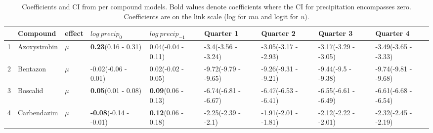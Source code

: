 \begingroup\fontsize{8pt}{10pt}\selectfont
\begin{longtable}{lp{2cm}p{0.6cm}p{1.8cm}p{1.8cm}p{1.8cm}p{1.8cm}p{1.8cm}p{1.8cm}}
\caption{Coefficients and CI from per compound models. 
                     Bold values denote coefficients where the CI for precipitation encompasses zero.
                     Coefficients are on the link scale (log for $mu$ and logit for $
u$).} \\ 
  \toprule
 & Compound & effect & $log~precip_0$ & $log~precip_{-1}$ & Quarter 1 & Quarter 2 & Quarter 3 & Quarter 4 \\ 
  \midrule
1 & Azoxystrobin & $\mu$ & \textbf{0.23}\newline (0.16 - 0.31) & 0.04\newline (-0.04 - 0.11) & -3.4\newline (-3.56 - -3.24) & -3.05\newline (-3.17 - -2.93) & -3.17\newline (-3.29 - -3.05) & -3.49\newline (-3.65 - -3.33) \\ 
  2 & Bentazon & $\mu$ & -0.02\newline (-0.06 - 0.01) & 0.02\newline (-0.02 - 0.05) & -9.72\newline (-9.79 - -9.65) & -9.26\newline (-9.31 - -9.21) & -9.44\newline (-9.5 - -9.38) & -9.74\newline (-9.81 - -9.68) \\ 
  3 & Boscalid & $\mu$ & \textbf{0.05}\newline (0.01 - 0.08) & \textbf{0.09}\newline (0.06 - 0.13) & -6.74\newline (-6.81 - -6.67) & -6.47\newline (-6.53 - -6.41) & -6.55\newline (-6.61 - -6.49) & -6.61\newline (-6.68 - -6.54) \\ 
  4 & Carbendazim & $\mu$ & \textbf{-0.08}\newline (-0.14 - -0.01) & \textbf{0.12}\newline (0.06 - 0.18) & -2.25\newline (-2.39 - -2.1) & -1.91\newline (-2.01 - -1.81) & -2.12\newline (-2.22 - -2.01) & -2.32\newline (-2.45 - -2.19) \\ 

\end{longtable}
